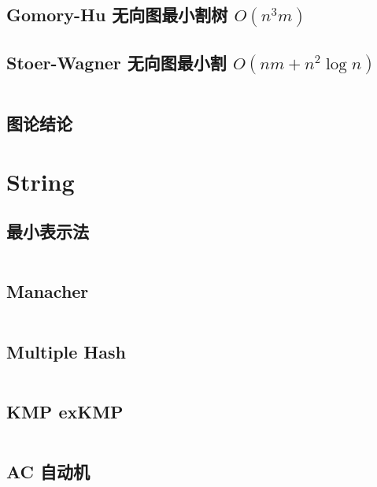 \documentclass[titlepage, a4paper]{article}
\begin{document}
\begin{multicols}{2}
\begin{spacing}{0.6}
				\subsection{Gomory-Hu 无向图最小割树 $O(n ^ 3 m)$}
				
				\subsection{Stoer-Wagner 无向图最小割 $O(nm + n ^ 2 \log n)$}
				\inputminted{cpp}{src/yzh/Stoer-Wagner.cpp}
				
				\subsection{图论结论}
				
				
				
				
				
			
			\section{String}
				\subsection{最小表示法}
				\inputminted{cpp}{src/String/最小表示法.cpp}
				\subsection{Manacher}
				\inputminted{cpp}{src/String/Manacher.cpp}
				\subsection{Multiple Hash}
				\inputminted{cpp}{src/String/hash.cpp}	
				\subsection{KMP exKMP}
				\inputminted{cpp}{src/String/KMP.cpp}
				\subsection{AC 自动机}
				\inputminted{cpp}{src/String/AC 自动机.cpp}

\end{spacing}
\end{multicols}
\end{document}
